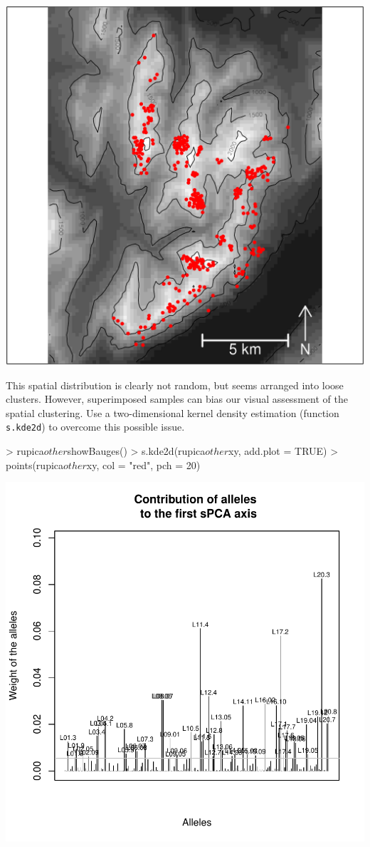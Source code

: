 \documentclass{article}
\begin{document}
\includegraphics{figs/spca-023}

This spatial distribution is clearly not random, but seems arranged into
loose clusters.
However, superimposed samples can bias our visual assessment of the spatial clustering.
Use a two-dimensional kernel density estimation (function \texttt{s.kde2d}) to overcome this possible
issue.
\begin{Schunk}
\begin{Sinput}
> rupica$other$showBauges()
> s.kde2d(rupica$other$xy, add.plot = TRUE)
> points(rupica$other$xy, col = "red", pch = 20)
\end{Sinput}
\end{Schunk}
\includegraphics{figs/spca-024}
\end{document}
